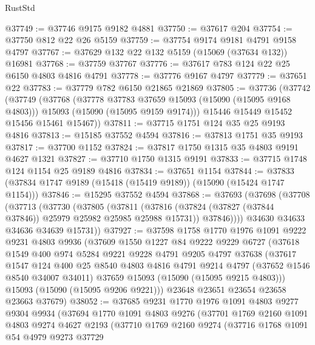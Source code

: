 \begin{lexlean}{RustStd}
\begin{coremodule}
@37749 := @37746 @9175 @9182 @4881
@37750 := @37617 @204
@37754 := @37750 @812 @22 @26 @5159
@37759 := @37754 @9174 @9181 @4791 @9158 @4797
@37767 := @37629 @132 @22 @132 @5159 (@15069 (@37634 @132)) @16981
@37768 := @37759 @37767
@37776 := @37617 @783 @124 @22 @25 @6150 @4803 @4816 @4791
@37778 := @37776 @9167 @4797
@37779 := @37651 @22
@37783 := @37779 @782 @6150 @21865 @21869
@37805 := @37736
    (@37742
      (@37749
        (@37768
          (@37778 @37783 @37659 @15093 (@15090 (@15095 @9168 @4803)))
          @15093
          (@15090 (@15095 @9159 @9174)))
        @15446
        @15449
        @15452
        @15456
        @15461
        @15467))
@37811 := @37715 @1751 @124 @35 @25 @9193 @4816
@37813 := @15185 @37552 @4594
@37816 := @37813 @1751 @35 @9193
@37817 := @37700 @1152
@37824 := @37817 @1750 @1315 @35 @4803 @9191 @4627 @1321
@37827 := @37710 @1750 @1315 @9191
@37833 := @37715 @1748 @124 @1154 @25 @9189 @4816
@37834 := @37651 @1154
@37844 := @37833 (@37834 @1747 @9189 (@15418 (@15419 @9189)) (@15090 (@15424 @1747 @1154)))
@37846 := @15295 @37552 @4594
@37868 := @37693
    (@37698
      (@37708
        (@37713
          (@37730
            (@37805
              (@37811
                (@37816 (@37824 (@37827 (@37844 @37846)) @25979 @25982 @25985 @25988 @15731))
                @37846))))
        @34630
        @34633
        @34636
        @34639
        @15731))
@37927 := @37598
    @1758
    @1770
    @1976
    @1091
    @9222
    @9231
    @4803
    @9936
    (@37609
      @1550
      @1227
      @84
      @9222
      @9229
      @6727
      (@37618
        @1549
        @400
        @974
        @5284
        @9221
        @9228
        @4791
        @9205
        @4797
        @37638
        (@37617
          @1547
          @124
          @400
          @25
          @8540
          @4803
          @4816
          @4791
          @9214
          @4797
          (@37652 @1546 @8540 @34007 @34011)
          @37659
          @15093
          (@15090 (@15095 @9215 @4803)))
        @15093
        (@15090 (@15095 @9206 @9221)))
      @23648
      @23651
      @23654
      @23658
      @23663
      @37679)
@38052 := @37685
    @9231
    @1770
    @1976
    @1091
    @4803
    @9277
    @9304
    @9934
    (@37694
      @1770
      @1091
      @4803
      @9276
      (@37701
        @1769
        @2160
        @1091
        @4803
        @9274
        @4627
        @2193
        (@37710
          @1769
          @2160
          @9274
          (@37716
            @1768
            @1091
            @54
            @4979
            @9273
            @37729

\end{coremodule}
\end{lexlean}
